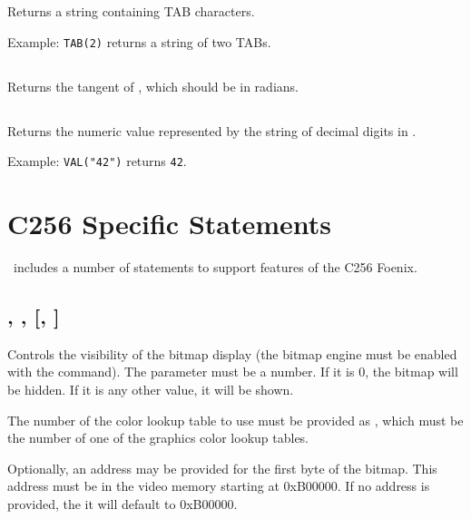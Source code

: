 \documentclass{report}
\begin{document}
    Returns a string containing  TAB characters.
    
    Example: \verb+TAB(2)+ returns a string of two TABs.

    \subsection*{}

    Returns the tangent of , which should be in radians.

    \subsection*{}

    Returns the numeric value represented by the string of decimal digits in .
    
    Example: \verb+VAL("42")+ returns \verb+42+.

    \section*{C256 Specific Statements}

    \BASIC\ includes a number of statements to support features of the C256 Foenix.

    \subsection*{ , ,  [, ]}

    Controls the visibility of the bitmap display (the bitmap engine must be
    enabled with the  command). The parameter 
    must be a number. If it is 0, the bitmap will be hidden. If it is any other
    value, it will be shown.

    The number of the color lookup table to use must be provided as ,
    which must be the number of one of the graphics color lookup tables.

    Optionally, an address may be provided for the first byte of the bitmap.
    This address must be in the video memory starting at 0xB00000.
    If no address is provided, the it will default to 0xB00000.

    \subsection*{ }
\end{document}
